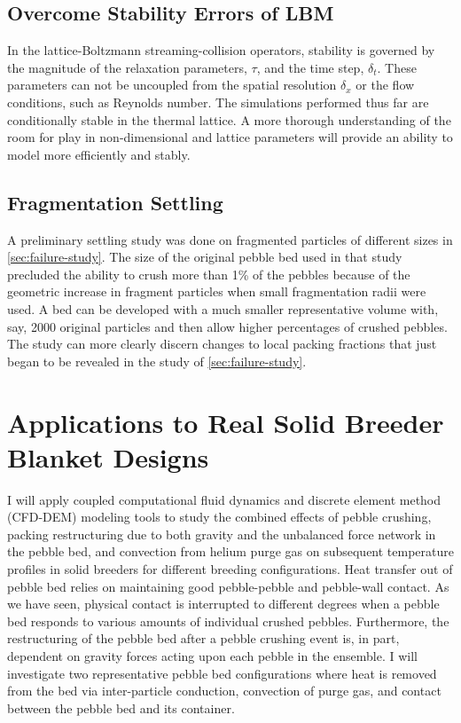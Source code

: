 \subsection{Overcome Stability Errors of LBM}
In the lattice-Boltzmann streaming-collision operators, stability is governed by the magnitude of the relaxation parameters, $\tau$, and the time step, $\delta_t$. These parameters can not be uncoupled from the spatial resolution $\delta_x$ or the flow conditions, such as Reynolds number. The simulations performed thus far are conditionally stable in the thermal lattice. A more thorough understanding of the room for play in non-dimensional and lattice parameters will provide an ability to model more efficiently and stably. 

\subsection{Fragmentation Settling}
A preliminary settling study was done on fragmented particles of different sizes in \cref{sec:failure-study}. The size of the original pebble bed used in that study precluded the ability to crush more than 1\% of the pebbles because of the geometric increase in fragment particles when small fragmentation radii were used. A bed can be developed with a much smaller representative volume with, say, \num{2000} original particles and then allow higher percentages of crushed pebbles. The study can more clearly discern changes to local packing fractions that just began to be revealed in the study of \cref{sec:failure-study}.



\section{Applications to Real Solid Breeder Blanket Designs}\label{sec:applied-studies}

I will apply coupled computational fluid dynamics and discrete element method (CFD-DEM) modeling tools to study the combined effects of pebble crushing, packing restructuring due to both gravity and the unbalanced force network in the pebble bed, and convection from helium purge gas on subsequent temperature profiles in solid breeders for different breeding configurations. Heat transfer out of pebble bed relies on maintaining good pebble-pebble and pebble-wall contact. As we have seen, physical contact is interrupted to different degrees when a pebble bed responds to various amounts of individual crushed pebbles. Furthermore, the restructuring of the pebble bed after a pebble crushing event is, in part, dependent on gravity forces acting upon each pebble in the ensemble. I will investigate two representative pebble bed configurations where heat is removed from the bed via inter-particle conduction, convection of purge gas, and contact between the pebble bed and its container.

